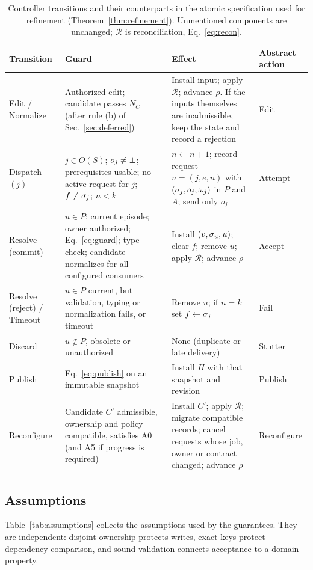 \begin{table}[!t]
\centering
\caption{Controller transitions and their counterparts in the atomic specification used for refinement (Theorem~\ref{thm:refinement}). Unmentioned components are unchanged; $\mathcal R$ is reconciliation, Eq.~\eqref{eq:recon}.}\label{tab:rules}
\footnotesize\setlength{\tabcolsep}{4pt}
\begin{tabular}{@{}P{22mm}P{64mm}P{58mm}P{22mm}@{}}\toprule
Transition & Guard & Effect & Abstract action\\\midrule
Edit / Normalize & Authorized edit; candidate passes $N_C$ (after rule (b) of Sec.~\ref{sec:deferred}) & Install input; apply $\mathcal R$; advance $\rho$. If the inputs themselves are inadmissible, keep the state and record a rejection & Edit\\
Dispatch$(j)$ & $j\in O(S)$; $o_j\ne\bot$; prerequisites usable; no active request for $j$; $f\ne\sigma_j$; $n<k$ & $n\gets n+1$; record request $u=(j,e,n)$ with $(\sigma_j,o_j,\omega_j)$ in $P$ and $A$; send only $o_j$ & Attempt\\
Resolve (commit) & $u\in P$; current episode; owner authorized; Eq.~\eqref{eq:guard}; type check; candidate normalizes for all configured consumers & Install $(v,\sigma_u,u)$; clear $f$; remove $u$; apply $\mathcal R$; advance $\rho$ & Accept\\
Resolve (reject) / Timeout & $u\in P$ current, but validation, typing or normalization fails, or timeout & Remove $u$; if $n=k$ set $f\gets\sigma_j$ & Fail\\
Discard & $u\notin P$, obsolete or unauthorized & None (duplicate or late delivery) & Stutter\\
Publish & Eq.~\eqref{eq:publish} on an immutable snapshot & Install $H$ with that snapshot and revision & Publish\\
Reconfigure & Candidate $C'$ admissible, ownership and policy compatible, satisfies A0 (and A5 if progress is required) & Install $C'$; apply $\mathcal R$; migrate compatible records; cancel requests whose job, owner or contract changed; advance $\rho$ & Reconfigure\\\bottomrule
\end{tabular}
\end{table}

\subsection{Assumptions}
Table~\ref{tab:assumptions} collects the assumptions used by the guarantees. They are independent: disjoint ownership protects writes, exact keys protect dependency comparison, and sound validation connects acceptance to a domain property.

